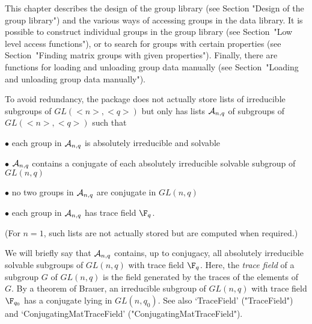 


This chapter describes the design of the {\IRREDSOL} group library (see 
Section "Design of the group library") and the
 various ways of accessing groups in the data library.
It is possible to construct individual groups in the group library (see
Section~"Low level access functions"), or to search for groups with certain
properties (see Section~"Finding matrix groups with given properties"). 
Finally, there are functions for loading and unloading group data 
manually (see Section~"Loading and unloading group data manually").



To avoid redundancy, the package {\IRREDSOL} does not actually store 
lists of irreducible subgroups of $GL(<n>, <q>)$ but
only has lists ${\cal
A}_{n,q}$ of subgroups of $GL(<n>, <q>)$ such that

\beginlist
\item{$\bullet$} each group in ${\cal A}_{n,q}$ is absolutely irreducible and
solvable

\item{$\bullet$} ${\cal A}_{n,q}$ contains a conjugate of each absolutely
irreducible solvable subgroup of $GL(n, q)$

\item{$\bullet$} no two groups in ${\cal A}_{n,q}$ are conjugate in  $GL(n, q)$

\item{$\bullet$} each group in ${\cal A}_{n,q}$ has trace field $\F_q$.

\endlist 
%
(For $n = 1$, such lists are not actually stored but are computed when required.)

We will briefly say that ${\cal A}_{n,q}$ contains, up to conjugacy, all absolutely
irreducible solvable subgroups of $GL(n,q)$ with trace field $\F_q$. 
Here, the {\it trace field} of a
subgroup $G$ of
$GL(n, q)$ is the field generated by the traces of the elements of~$G$. By a 
theorem of Brauer, an irreducible subgroup of $GL(n, q)$ with trace field $\F_{q_0}$ 
has a conjugate lying in $GL(n, q_0)$. See also `TraceField' ("TraceField")
and `ConjugatingMatTraceField' ("ConjugatingMatTraceField"). 

